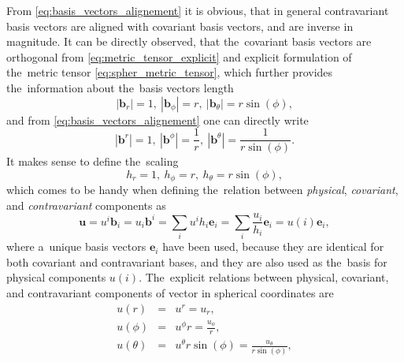 \documentclass[review]{elsarticle}
\newcommand{\vect}[1]{\boldsymbol{#1}}
\begin{document}
From \eqref{eq:basis_vectors_alignement} it is obvious, 
that in general contravariant basis vectors are aligned with covariant basis 
vectors, and are inverse in magnitude.
It can be directly observed, that the~covariant basis vectors are orthogonal
from \eqref{eq:metric_tensor_explicit} and explicit formulation of 
the~metric tensor \eqref{eq:spher_metric_tensor}, which further provides
the~information about the~basis vectors length
\begin{equation}
  |\vect{b}_r| = 1,~ |\vect{b}_\phi| = r,~ |\vect{b}_\theta| = r\sin(\phi), 
  \nonumber
\end{equation} 
and from \eqref{eq:basis_vectors_alignement} one can directly write
\begin{equation}
  |\vect{b}^r| = 1,~ |\vect{b}^\phi| = \frac{1}{r},~ 
  |\vect{b}^\theta| = \frac{1}{r\sin(\phi)}.
  \nonumber
\end{equation}
It makes sense to define the~scaling
\begin{equation}
  h_r = 1,~ h_\phi = r,~ h_\theta = r\sin(\phi), 
  \label{eq:spher_scaling}
\end{equation} 
which comes to be handy when defining the~relation between 
\textit{physical}, \textit{covariant}, and \textit{contravariant} components as
\begin{equation}
  \vect{u} = u^i \vect{b}_i = u_i \vect{b}^i = \sum_i u^i h_i \vect{e}_i
  = \sum_i \frac{u_i}{h_i} \vect{e}_i = u(i) \vect{e}_i,
  \label{eq:spher_components}
\end{equation}
where a~unique basis vectors $\vect{e}_i$ have been used, because they are 
identical for both covariant and contravariant bases, and they are also used
as the~basis for physical components $u(i)$.
The~explicit relations between physical, covariant, and contravariant components
of vector in spherical coordinates are
\begin{eqnarray}
  u(r) &=& u^r = u_r , \nonumber\\ 
  u(\phi) &=& u^\phi r = \frac{u_\phi}{r} , \nonumber\\
   u(\theta) &=& u^\theta r\sin(\phi) = \frac{u_\theta}{r\sin(\phi)} ,
  \label{eq:spher_physical_components}
\end{eqnarray}
\end{document}
